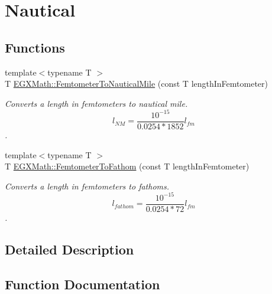 \hypertarget{group___e_g_x_math-_conversions-_length_conversions-_s_i-_femtometer-_nautical}{}\section{Nautical}
\label{group___e_g_x_math-_conversions-_length_conversions-_s_i-_femtometer-_nautical}
\subsection*{Functions}
\begin{DoxyCompactItemize}
\item 
{\footnotesize template$<$typename T $>$ }\\T \mbox{\hyperlink{group___e_g_x_math-_conversions-_length_conversions-_s_i-_femtometer-_nautical_gae44357e3e44868120d603cff76cefd77}{E\+G\+X\+Math\+::\+Femtometer\+To\+Nautical\+Mile}} (const T length\+In\+Femtometer)
\begin{DoxyCompactList}\small\item\em Converts a length in femtometers to nautical mile. \[ l_{NM}= \frac{10^{-15}}{0.0254 * 1852} l_{fm} \]. \end{DoxyCompactList}\item 
{\footnotesize template$<$typename T $>$ }\\T \mbox{\hyperlink{group___e_g_x_math-_conversions-_length_conversions-_s_i-_femtometer-_nautical_ga2a7aadfe2325db467434f8bc9b2d9ed9}{E\+G\+X\+Math\+::\+Femtometer\+To\+Fathom}} (const T length\+In\+Femtometer)
\begin{DoxyCompactList}\small\item\em Converts a length in femtometers to fathoms. \[ l_{fathom}= \frac{10^{-15}}{0.0254 * 72} l_{fm} \]. \end{DoxyCompactList}\end{DoxyCompactItemize}


\subsection{Detailed Description}


\subsection{Function Documentation}
\mbox{\label{group___e_g_x_math-_conversions-_length_conversions-_s_i-_femtometer-_nautical_ga2a7aadfe2325db467434f8bc9b2d9ed9}} 
